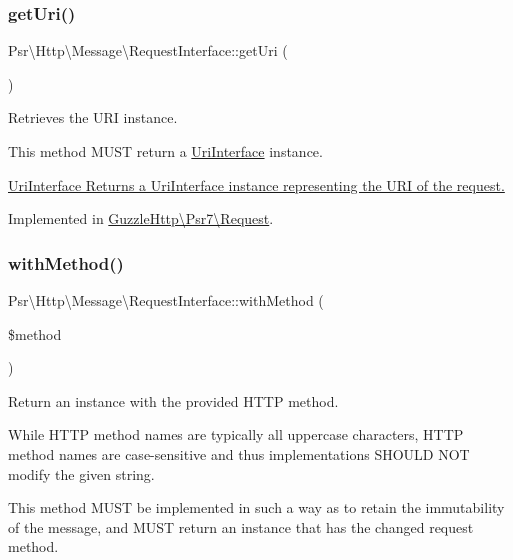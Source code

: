 \subsubsection{\texorpdfstring{get\+Uri()}{getUri()}}
{\footnotesize\ttfamily Psr\textbackslash{}\+Http\textbackslash{}\+Message\textbackslash{}\+Request\+Interface\+::get\+Uri (\begin{DoxyParamCaption}{ }\end{DoxyParamCaption})}

Retrieves the U\+RI instance.

This method M\+U\+ST return a \hyperlink{interfacePsr_1_1Http_1_1Message_1_1UriInterface}{Uri\+Interface} instance.

\hyperlink{}{Uri\+Interface Returns a Uri\+Interface instance representing the U\+RI of the request. }

Implemented in \hyperlink{classGuzzleHttp_1_1Psr7_1_1Request_a79d73a7f5e75d671a379ee95e3692a1e}{Guzzle\+Http\textbackslash{}\+Psr7\textbackslash{}\+Request}.

\mbox{\label{interfacePsr_1_1Http_1_1Message_1_1RequestInterface_aa48dc3287b9848e0da3425973a60653e}} 
\subsubsection{\texorpdfstring{with\+Method()}{withMethod()}}
{\footnotesize\ttfamily Psr\textbackslash{}\+Http\textbackslash{}\+Message\textbackslash{}\+Request\+Interface\+::with\+Method (\begin{DoxyParamCaption}\item[{}]{\$method }\end{DoxyParamCaption})}

Return an instance with the provided H\+T\+TP method.

While H\+T\+TP method names are typically all uppercase characters, H\+T\+TP method names are case-\/sensitive and thus implementations S\+H\+O\+U\+LD N\+OT modify the given string.

This method M\+U\+ST be implemented in such a way as to retain the immutability of the message, and M\+U\+ST return an instance that has the changed request method.


